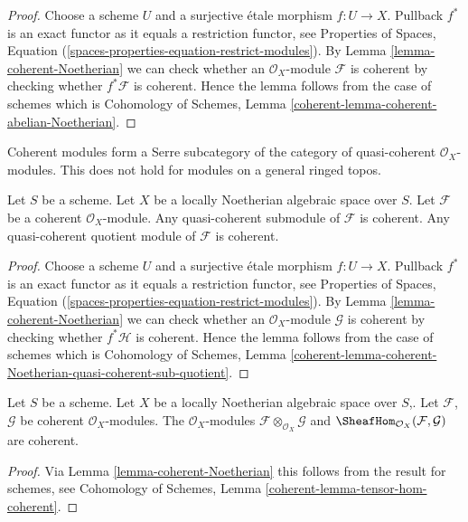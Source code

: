 \begin{proof}
Choose a scheme $U$ and a surjective \'etale morphism $f : U \to X$.
Pullback $f^*$ is an exact functor as it equals a restriction functor, see
Properties of Spaces, Equation
(\ref{spaces-properties-equation-restrict-modules}).
By
Lemma \ref{lemma-coherent-Noetherian} we can check whether an
$\mathcal{O}_X$-module $\mathcal{F}$ is
coherent by checking whether $f^*\mathcal{F}$ is coherent. Hence the
lemma follows from the case of schemes which is
Cohomology of Schemes, Lemma \ref{coherent-lemma-coherent-abelian-Noetherian}.
\end{proof}

\noindent
Coherent modules form a Serre subcategory of the
category of quasi-coherent $\mathcal{O}_X$-modules. This does not hold
for modules on a general ringed topos.

\begin{lemma}
\label{lemma-coherent-Noetherian-quasi-coherent-sub-quotient}
Let $S$ be a scheme.
Let $X$ be a locally Noetherian algebraic space over $S$.
Let $\mathcal{F}$ be a coherent $\mathcal{O}_X$-module.
Any quasi-coherent submodule of $\mathcal{F}$ is coherent.
Any quasi-coherent quotient module of $\mathcal{F}$ is coherent.
\end{lemma}

\begin{proof}
Choose a scheme $U$ and a surjective \'etale morphism $f : U \to X$.
Pullback $f^*$ is an exact functor as it equals a restriction functor, see
Properties of Spaces, Equation
(\ref{spaces-properties-equation-restrict-modules}).
By
Lemma \ref{lemma-coherent-Noetherian} we can check whether an
$\mathcal{O}_X$-module $\mathcal{G}$ is
coherent by checking whether $f^*\mathcal{H}$ is coherent. Hence the
lemma follows from the case of schemes which is
Cohomology of Schemes, Lemma
\ref{coherent-lemma-coherent-Noetherian-quasi-coherent-sub-quotient}.
\end{proof}

\begin{lemma}
\label{lemma-tensor-hom-coherent}
Let $S$ be a scheme.
Let $X$ be a locally Noetherian algebraic space over $S$,.
Let $\mathcal{F}$, $\mathcal{G}$ be coherent $\mathcal{O}_X$-modules.
The $\mathcal{O}_X$-modules $\mathcal{F} \otimes_{\mathcal{O}_X} \mathcal{G}$
and $\SheafHom_{\mathcal{O}_X}(\mathcal{F}, \mathcal{G})$ are
coherent.
\end{lemma}

\begin{proof}
Via Lemma \ref{lemma-coherent-Noetherian} this follows from the result
for schemes, see
Cohomology of Schemes, Lemma \ref{coherent-lemma-tensor-hom-coherent}.
\end{proof}

